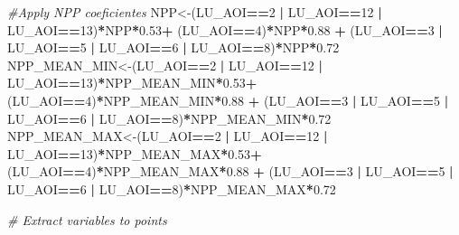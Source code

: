 \documentclass[
  10pt,
  b5paper,
]{book}
\newenvironment{Shaded}{\begin{snugshade}}{\end{snugshade}}
\newcommand{\CommentTok}[1]{\textcolor[rgb]{0.56,0.35,0.01}{\textit{#1}}}
\newcommand{\DecValTok}[1]{\textcolor[rgb]{0.00,0.00,0.81}{#1}}
\newcommand{\FloatTok}[1]{\textcolor[rgb]{0.00,0.00,0.81}{#1}}
\newcommand{\NormalTok}[1]{#1}
\newcommand{\OperatorTok}[1]{\textcolor[rgb]{0.81,0.36,0.00}{\textbf{#1}}}
\newcommand{\StringTok}[1]{\textcolor[rgb]{0.31,0.60,0.02}{#1}}
\begin{document}
\begin{Shaded}
\begin{Highlighting}[]
\CommentTok{#Apply NPP coeficientes}
\NormalTok{NPP<-(LU_AOI}\OperatorTok{==}\DecValTok{2} \OperatorTok{|}\StringTok{ }\NormalTok{LU_AOI}\OperatorTok{==}\DecValTok{12} \OperatorTok{|}\StringTok{ }\NormalTok{LU_AOI}\OperatorTok{==}\DecValTok{13}\NormalTok{)}\OperatorTok{*}\NormalTok{NPP}\OperatorTok{*}\FloatTok{0.53}\OperatorTok{+}\StringTok{ }\NormalTok{(LU_AOI}\OperatorTok{==}\DecValTok{4}\NormalTok{)}\OperatorTok{*}\NormalTok{NPP}\OperatorTok{*}\FloatTok{0.88} \OperatorTok{+}\StringTok{ }\NormalTok{(LU_AOI}\OperatorTok{==}\DecValTok{3} \OperatorTok{|}\StringTok{ }\NormalTok{LU_AOI}\OperatorTok{==}\DecValTok{5} \OperatorTok{|}\StringTok{ }\NormalTok{LU_AOI}\OperatorTok{==}\DecValTok{6} \OperatorTok{|}\StringTok{ }\NormalTok{LU_AOI}\OperatorTok{==}\DecValTok{8}\NormalTok{)}\OperatorTok{*}\NormalTok{NPP}\OperatorTok{*}\FloatTok{0.72}
\NormalTok{NPP_MEAN_MIN<-(LU_AOI}\OperatorTok{==}\DecValTok{2} \OperatorTok{|}\StringTok{ }\NormalTok{LU_AOI}\OperatorTok{==}\DecValTok{12} \OperatorTok{|}\StringTok{ }\NormalTok{LU_AOI}\OperatorTok{==}\DecValTok{13}\NormalTok{)}\OperatorTok{*}\NormalTok{NPP_MEAN_MIN}\OperatorTok{*}\FloatTok{0.53}\OperatorTok{+}\StringTok{ }\NormalTok{(LU_AOI}\OperatorTok{==}\DecValTok{4}\NormalTok{)}\OperatorTok{*}\NormalTok{NPP_MEAN_MIN}\OperatorTok{*}\FloatTok{0.88} \OperatorTok{+}\StringTok{ }\NormalTok{(LU_AOI}\OperatorTok{==}\DecValTok{3} \OperatorTok{|}\StringTok{ }\NormalTok{LU_AOI}\OperatorTok{==}\DecValTok{5} \OperatorTok{|}\StringTok{ }\NormalTok{LU_AOI}\OperatorTok{==}\DecValTok{6} \OperatorTok{|}\StringTok{ }\NormalTok{LU_AOI}\OperatorTok{==}\DecValTok{8}\NormalTok{)}\OperatorTok{*}\NormalTok{NPP_MEAN_MIN}\OperatorTok{*}\FloatTok{0.72}
\NormalTok{NPP_MEAN_MAX<-(LU_AOI}\OperatorTok{==}\DecValTok{2} \OperatorTok{|}\StringTok{ }\NormalTok{LU_AOI}\OperatorTok{==}\DecValTok{12} \OperatorTok{|}\StringTok{ }\NormalTok{LU_AOI}\OperatorTok{==}\DecValTok{13}\NormalTok{)}\OperatorTok{*}\NormalTok{NPP_MEAN_MAX}\OperatorTok{*}\FloatTok{0.53}\OperatorTok{+}\StringTok{ }\NormalTok{(LU_AOI}\OperatorTok{==}\DecValTok{4}\NormalTok{)}\OperatorTok{*}\NormalTok{NPP_MEAN_MAX}\OperatorTok{*}\FloatTok{0.88} \OperatorTok{+}\StringTok{ }\NormalTok{(LU_AOI}\OperatorTok{==}\DecValTok{3} \OperatorTok{|}\StringTok{ }\NormalTok{LU_AOI}\OperatorTok{==}\DecValTok{5} \OperatorTok{|}\StringTok{ }\NormalTok{LU_AOI}\OperatorTok{==}\DecValTok{6} \OperatorTok{|}\StringTok{ }\NormalTok{LU_AOI}\OperatorTok{==}\DecValTok{8}\NormalTok{)}\OperatorTok{*}\NormalTok{NPP_MEAN_MAX}\OperatorTok{*}\FloatTok{0.72}


\CommentTok{# Extract variables to points}


\end{Highlighting}
\end{Shaded}
\end{document}
